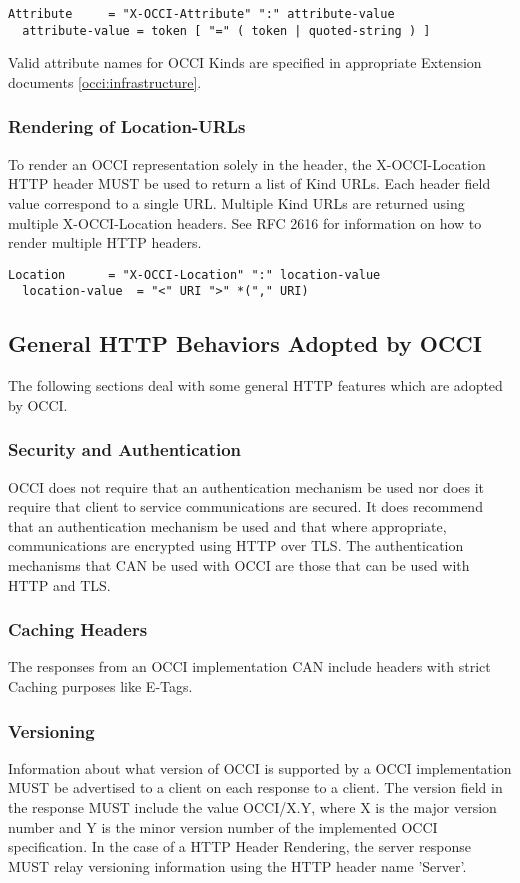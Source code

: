 \documentclass[10pt,a4paper]{article}
\begin{document}
\begin{verbatim}
Attribute     = "X-OCCI-Attribute" ":" attribute-value
  attribute-value = token [ "=" ( token | quoted-string ) ]
\end{verbatim}

Valid attribute names for OCCI Kinds are specified in appropriate
Extension documents \ref{occi:infrastructure}.

\subsubsection{Rendering of Location-URLs}
To render an OCCI representation solely in the header, the
X-OCCI-Location HTTP header MUST be used to return a list of Kind
URLs. Each header field value correspond to a single URL. Multiple
Kind URLs are returned using multiple X-OCCI-Location headers. See RFC
2616 for information on how to render multiple HTTP headers.

\begin{verbatim}
Location      = "X-OCCI-Location" ":" location-value
  location-value  = "<" URI ">" *("," URI)
\end{verbatim}

\subsection{General HTTP Behaviors Adopted by OCCI}
The following sections deal with some general HTTP features which are
adopted by OCCI.

\subsubsection{Security and Authentication}
OCCI does not require that an authentication mechanism be used nor
does it require that client to service communications are secured. It
does recommend that an authentication mechanism be used and that where
appropriate, communications are encrypted using HTTP over TLS. The
authentication mechanisms that CAN be used with OCCI are those that
can be used with HTTP and TLS.

\subsubsection{Caching Headers}
The responses from an OCCI implementation CAN include headers with
strict Caching purposes like E-Tags.

\subsubsection{Versioning}
Information about what version of OCCI is supported by a OCCI
implementation MUST be advertised to a client on each response to a
client. The version field in the response MUST include the value
OCCI/X.Y, where X is the major version number and Y is the minor
version number of the implemented OCCI specification. In the case of a
HTTP Header Rendering, the server response MUST relay versioning
information using the HTTP header name 'Server'.
\end{document}
